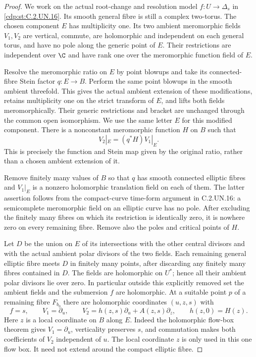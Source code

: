 \begin{proof}
We work on the actual root-change and resolution model
$f:U\to\Delta_s$ in \ref{cdp:st:C.2.UN.16}. Its smooth general fibre
is still a complex two-torus. The chosen component $E$
has multiplicity one. Its two ambient meromorphic fields
$V_1,V_2$ are vertical, commute, are holomorphic and
independent on each general torus, and have no pole along
the generic point of $E$. Their restrictions are independent
over $\C$ and have rank one over the meromorphic function
field of $E$.

Resolve the meromorphic ratio on $E$ by point blowups
and take its connected-fibre Stein factor $q:E\to B$.
Perform the same point blowups in the smooth ambient
threefold. This gives the actual ambient extension of
these modifications, retains multiplicity one on the
strict transform of $E$, and lifts both fields
meromorphically. Their generic restrictions and bracket
are unchanged through the common open isomorphism.
We use the same letter $E$ for this modified component.
There is a nonconstant meromorphic function $H$ on $B$
such that
\[
                    V_2|_E=(q^*H)V_1|_E.
                                                               \tag{C.RG.3}\label{cdp:eq:C.RG.3}
\]
This is precisely the function and Stein map given by
the original ratio, rather than a chosen ambient extension
of it.

Remove finitely many values of $B$ so that $q$ has smooth
connected elliptic fibres and $V_1|_E$ is a nonzero
holomorphic translation field on each of them. The latter
assertion follows from the compact-curve time-form argument
in C.2.UN.16: a semicomplete meromorphic field on an
elliptic curve has no pole. After excluding the finitely
many fibres on which its restriction is identically zero,
it is nowhere zero on every remaining fibre. Remove also
the poles and critical points of $H$.

Let $D$ be the union on $E$ of its intersections with
the other central divisors and with the actual ambient
polar divisors of the two fields. Each remaining general
elliptic fibre meets $D$ in finitely many points, after
discarding any finitely many fibres contained in $D$.
The fields are holomorphic on $U^*$; hence all their
ambient polar divisors lie over zero. In particular
outside this explicitly removed set the ambient fields
and the submersion $f$ are holomorphic. At a suitable
point $p$ of a remaining fibre $F_{b_0}$ there are
holomorphic coordinates $(u,z,s)$ with
\[
 f=s,\qquad V_1=\partial_u,\qquad
 V_2=h(z,s)\partial_u+A(z,s)\partial_z,
 \qquad h(z,0)=H(z).
                                                               \tag{C.RG.4}\label{cdp:eq:C.RG.4}
\]
Here $z$ is a local coordinate on $B$ along $E$.
Indeed the holomorphic flow-box theorem gives $V_1=\partial_u$,
verticality preserves $s$, and commutation makes both
coefficients of $V_2$ independent of $u$. The local coordinate
$z$ is only used in this one flow box. It need not extend
around the compact elliptic fibre.


\end{proof}
